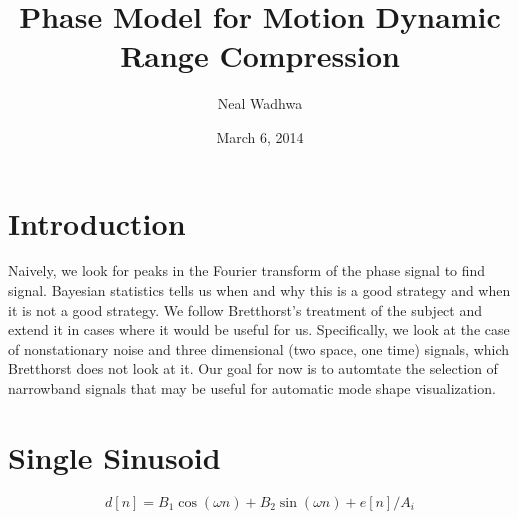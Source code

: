 \documentclass[letterpaper, 10pt]{article}
\author{Neal Wadhwa}
\title{Phase Model for Motion Dynamic Range Compression}
\date{March 6, 2014}
\newcommand{\tmop}[1]{\operatorname{#1}}
\numberwithin{equation}{section}
\begin{document}
\newcommand{\D}{\mathcal{D}}
\newcommand{\pr}{\tmop{Pr}}
\newcommand{\R}{\mathbb{R}}
\newcommand{\beq}{\begin{equation}}
\newcommand{\eeq}{\end{equation}}
\newcommand{\E}{\mathbb{E}}
\newcommand{\Var}{\text{Var}}
\noindent
\maketitle
\section{Introduction}
Naively, we look for peaks in the Fourier transform of the phase signal to find signal. Bayesian statistics tells us when and why this is a good strategy and when it is not a good strategy. We follow Bretthorst's treatment of the subject and extend it in cases where it would be useful for us. Specifically, we look at the case of nonstationary noise and three dimensional (two space, one time) signals, which Bretthorst does not look at it. Our goal for now is to automtate the selection of narrowband signals that may be useful for automatic mode shape visualization. 

\section{Single Sinusoid} 
\beq d[n] = B_1 \cos(\omega n)+B_2\sin(\omega n) + e[n]/A_i\eeq
\end{document}
